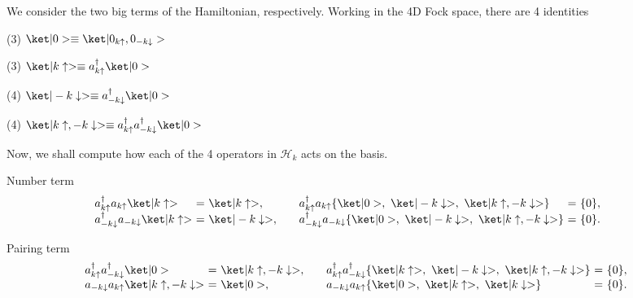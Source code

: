 \begin{solution}\leavevmode
  \begin{enumext}
    \item We consider the two big terms of the Hamiltonian, respectively.
    Working in the 4D Fock space, there are 4 identities
    \begin{enumext*}[columns = 14]
      \item(3) $\ket|0> \equiv \ket|0_{k\uparrow}, 0_{-k\downarrow}>$
      \item(3) $\ket|k\uparrow> \equiv a_{k\uparrow}^\dagger \ket|0>$
      \item(4) $\ket|-k\downarrow> \equiv a_{-k\downarrow}^\dagger \ket|0>$
      \item(4) $\ket|k\uparrow, -k\downarrow>
                \equiv a_{k\uparrow}^\dagger a_{-k\downarrow}^\dagger \ket|0>$
    \end{enumext*}
    Now, we shall compute how each of the 4 operators in $\mathcal H_k$ acts on
    the basis.
    \begin{enumext}
      \item Number term
      \[
        \begin{array}{*3{l@{~}c@{~}l@{\qquad}}l@{~}c@{~}l}
          a_{k\uparrow}^\dagger a_{k\uparrow} \ket|k\uparrow>   & =
        & \ket|k\uparrow>, &
          a_{k\uparrow}^\dagger a_{k\uparrow}
          \{\ket|0>,\ \ket|-k\downarrow>,\ \ket|k\uparrow, -k\downarrow>\} & =
        & \{0\},\\
          a_{-k\downarrow}^\dagger a_{-k\downarrow} \ket|k\uparrow>   & =
        & \ket|-k\downarrow>, &
          a_{-k\downarrow}^\dagger a_{-k\downarrow}
          \{\ket|0>,\ \ket|-k\downarrow>,\ \ket|k\uparrow, -k\downarrow>\} & =
        & \{0\}.
        \end{array}
      \]
      \item Pairing term
      \[
        \begin{array}{l@{~}c@{~}l@{\qquad}l@{~}c@{~}l}
          a_{k\uparrow}^\dagger a_{-k\downarrow}^\dagger \ket|0> & =
        & \ket|k\uparrow, -k\downarrow>, &
          a_{k\uparrow}^\dagger a_{-k\downarrow}^\dagger
          \{\ket|k\uparrow>,\ \ket|-k\downarrow>,\
            \ket|k\uparrow, -k\downarrow>\} & = & \{0\},\\
          a_{-k\downarrow} a_{k\uparrow} \ket|k\uparrow, -k\downarrow>
         & = & \ket|0>, &
          a_{-k\downarrow} a_{k\uparrow}
          \{\ket|0>,\ \ket|k\uparrow>,\ \ket|k\downarrow>\} & = & \{0\}.
        \end{array}
\]
\end{enumext}
\end{enumext}
\end{solution}
